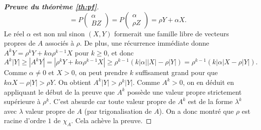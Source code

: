 \documentclass[11pt]{article}
\newcommand{\module}[1]{\left\lvert #1 \right\rvert}
\renewcommand{\geq}{\geqslant}
\theoremstyle{plain}
\begin{document}
\begin{proof}[\emph{\textbf{Preuve du théorème \ref{th:pf}}}]
$$    = P\begin{pmatrix}\alpha\\B Z\end{pmatrix}
    = P\begin{pmatrix}\alpha\\\rho Z\end{pmatrix}
    = \rho Y + \alpha X.$$
    Le réel $\alpha$ est non nul sinon $(X, Y)$ formerait une famille libre de vecteurs propres de $A$ associés à $\rho$. De plus, une récurrence immédiate donne $A^k Y = \rho^k Y + k\alpha \rho^{k-1}X$ pour $k \geq 0$, et donc
    $$A^k \module{Y} \geq \module{A^k Y} = \module{\rho^k Y + k\alpha \rho^{k-1}X} \geq \rho^{k-1}(k\module{\alpha} \module{X} - \rho \module{Y}) = \rho^{k-1}(k\module{\alpha} X - \rho \module{Y}).$$
    Comme $\alpha \neq 0$ et $X > 0$, on peut prendre $k$ suffisament grand pour que $k\alpha X - \rho \module{Y} > \rho Y$. On obtient $A^k \module{Y} > \rho^k \module{Y}$. Comme $A^k > 0$, on en déduit en appliquant le début de la preuve que $A^k$ possède une valeur propre strictement supérieure à $\rho ^k$. C'est absurde car toute valeur propre de $A^k$ est de la forme $\lambda^k$ avec $\lambda$ valeur propre de $A$ (par trigonalisation de $A$). On a donc montré que $\rho$ est racine d'ordre $1$ de $\chi_A$. Cela achève la preuve.
\end{proof}
\end{document}
